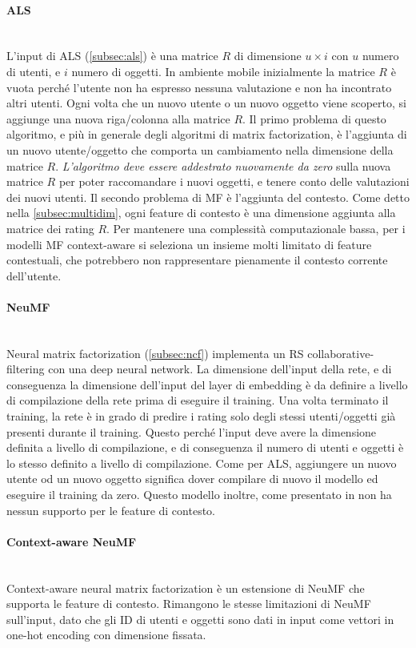 \documentclass[12pt,italian]{report}
\newcommand{\myparagraph}[1]{\paragraph{#1}\mbox{}\\} %
\begin{document}
\myparagraph{ALS}
L'input di ALS (\autoref{subsec:als}) è una matrice $R$ di dimensione $u \times i$ con $u$ numero di utenti, e $i$ numero di oggetti. In ambiente mobile inizialmente la matrice $R$ è vuota perché l'utente non ha espresso nessuna valutazione e non ha incontrato altri utenti. Ogni volta che un nuovo utente o un nuovo oggetto viene scoperto, si aggiunge una nuova riga/colonna alla matrice $R$. Il primo problema di questo algoritmo, e più in generale degli algoritmi di matrix factorization, è l'aggiunta di un nuovo utente/oggetto che comporta un cambiamento nella dimensione della matrice $R$. \textit{L'algoritmo deve essere addestrato nuovamente da zero} sulla nuova matrice $R$ per poter raccomandare i nuovi oggetti, e tenere conto delle valutazioni dei nuovi utenti. Il secondo problema di MF è l'aggiunta del contesto. Come detto nella \autoref{subsec:multidim}, ogni feature di contesto è una dimensione aggiunta alla matrice dei rating $R$. Per mantenere una complessità computazionale bassa, per i modelli MF context-aware si seleziona un insieme molti limitato di feature contestuali, che potrebbero non rappresentare pienamente il contesto corrente dell'utente.

\myparagraph{NeuMF}
Neural matrix factorization (\autoref{subsec:ncf}) implementa un RS
collaborative-filtering con una deep neural network. La dimensione dell'input della rete, e di conseguenza la dimensione dell'input del layer di embedding è da definire a livello di compilazione della rete prima di eseguire il training. Una volta terminato il training, la rete è in grado di predire i rating solo degli stessi utenti/oggetti già presenti durante il training. Questo perché l'input deve avere la  dimensione definita a livello di compilazione, e di conseguenza il numero di utenti e oggetti è lo stesso definito a livello di compilazione. Come per ALS, aggiungere un nuovo utente od un nuovo oggetto significa dover compilare di nuovo il modello ed eseguire il training da zero. Questo modello inoltre, come presentato in \cite{NCF} non ha nessun supporto per le feature di contesto.

\myparagraph{Context-aware NeuMF}
Context-aware neural matrix factorization è un estensione di NeuMF che supporta le feature di contesto. Rimangono le stesse limitazioni di NeuMF sull'input, dato che gli ID di utenti e oggetti sono dati in input come vettori in one-hot encoding con dimensione fissata. 

% 
% 
\end{document}
